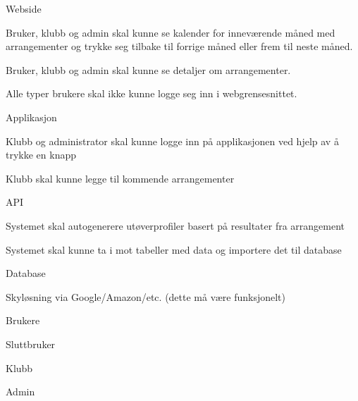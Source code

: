 \documentclass{article}
\begin{document}
\begin{legal}
    \item Webside
    \begin{legal}
        \item Bruker, klubb og admin skal kunne se kalender for inneværende måned med arrangementer og trykke seg tilbake til forrige måned eller frem til neste måned.
        \item Bruker, klubb og admin skal kunne se detaljer om arrangementer.
        \item Alle typer brukere skal ikke kunne logge seg inn i webgrensesnittet.
      
    \end{legal}
    \item Applikasjon
    \begin{legal}
        \item Klubb og administrator skal kunne logge inn på  applikasjonen ved hjelp av å trykke en knapp
        \item Klubb skal kunne legge til kommende arrangementer
        \item 
    \end{legal}
    \item API
    \begin{legal}
        \item Systemet skal autogenerere utøverprofiler basert på resultater fra arrangement
        \item Systemet skal kunne ta i mot tabeller med data og importere det til database
    \end{legal}
    \item Database
    \begin{legal}
        \item Skyløsning via Google/Amazon/etc. (dette må være funksjonelt)
    \end{legal}
    \item Brukere
    \begin{legal}
        \item Sluttbruker
        \item Klubb
        \item Admin
    \end{legal}
\end{legal}
\end{document}
